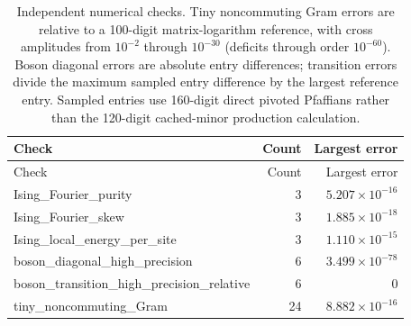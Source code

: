 \begin{longtable}{lrr}
\caption{Independent numerical checks. Tiny noncommuting Gram errors are relative to a 100-digit matrix-logarithm reference, with cross amplitudes from $10^{-2}$ through $10^{-30}$ (deficits through order $10^{-60}$). Boson diagonal errors are absolute entry differences; transition errors divide the maximum sampled entry difference by the largest reference entry. Sampled entries use 160-digit direct pivoted Pfaffians rather than the 120-digit cached-minor production calculation.}
\label{tab:scaling-independent-checks}\\\toprule
Check & Count & Largest error\\\midrule
\endfirsthead
\toprule
Check & Count & Largest error\\\midrule
\endhead
\bottomrule\endfoot
Ising\_Fourier\_purity & 3 & $5.207\!\times\!10^{-16}$\\
Ising\_Fourier\_skew & 3 & $1.885\!\times\!10^{-18}$\\
Ising\_local\_energy\_per\_site & 3 & $1.110\!\times\!10^{-15}$\\
boson\_diagonal\_high\_precision & 6 & $3.499\!\times\!10^{-78}$\\
boson\_transition\_high\_precision\_relative & 6 & 0\\
tiny\_noncommuting\_Gram & 24 & $8.882\!\times\!10^{-16}$\\
\end{longtable}
